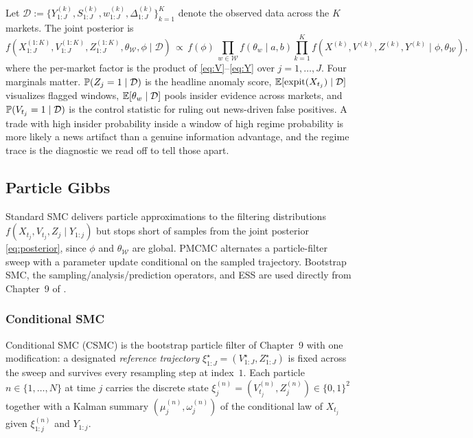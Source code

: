 Let $\mathcal{D} := \{Y_{1:J}^{(k)}, S_{1:J}^{(k)}, w_{1:J}^{(k)}, \Delta_{1:J}^{(k)}\}_{k=1}^K$ denote the observed data across the $K$ markets. The joint posterior is
\begin{equation}\label{eq:posterior}
f(X_{1:J}^{(1:K)}, V_{1:J}^{(1:K)}, Z_{1:J}^{(1:K)}, \theta_{\mathcal{W}}, \phi \mid \mathcal{D}) \,\propto\, f(\phi)\, \prod_{w \in \mathcal{W}} f(\theta_w \mid a, b) \prod_{k=1}^K f(X^{(k)}, V^{(k)}, Z^{(k)}, Y^{(k)} \mid \phi, \theta_{\mathcal{W}}),
\end{equation}
where the per-market factor is the product of \eqref{eq:V}--\eqref{eq:Y} over $j = 1, \dots, J$. Four marginals matter. $\operatorname{\mathbb{P}}(Z_j = 1 \mid \mathcal{D})$ is the headline anomaly score, $\operatorname{\mathbb{E}}[\mathrm{expit}(X_{t_j}) \mid \mathcal{D}]$ visualizes flagged windows, $\operatorname{\mathbb{E}}[\theta_w \mid \mathcal{D}]$ pools insider evidence across markets, and $\operatorname{\mathbb{P}}(V_{t_j}=1 \mid \mathcal{D})$ is the control statistic for ruling out news-driven false positives. A trade with high insider probability inside a window of high regime probability is more likely a news artifact than a genuine information advantage, and the regime trace is the diagnostic we read off to tell those apart.

\subsection{Particle Gibbs}\label{ssec:pg}

Standard SMC delivers particle approximations to the filtering distributions $f(X_{t_j}, V_{t_j}, Z_j \mid Y_{1:j})$ but stops short of samples from the joint posterior \eqref{eq:posterior}, since $\phi$ and $\theta_{\mathcal{W}}$ are global. PMCMC \citep{andrieu2010particle} alternates a particle-filter sweep with a parameter update conditional on the sampled trajectory. Bootstrap SMC, the sampling/analysis/prediction operators, and ESS are used directly from Chapter~9 of \citet{sanzalonso2025notes}.

\subsubsection{Conditional SMC}\label{sssec:csmc}

Conditional SMC (CSMC) is the bootstrap particle filter of Chapter~9 with one modification: a designated \emph{reference trajectory} $\xi^\star_{1:J} = (V^\star_{1:J}, Z^\star_{1:J})$ is fixed across the sweep and survives every resampling step at index~$1$. Each particle $n \in \{1, \dots, N\}$ at time $j$ carries the discrete state $\xi^{(n)}_j = (V^{(n)}_{t_j}, Z^{(n)}_j) \in \{0,1\}^2$ together with a Kalman summary $(\mu^{(n)}_j, \omega^{(n)}_j)$ of the conditional law of $X_{t_j}$ given $\xi^{(n)}_{1:j}$ and $Y_{1:j}$.


